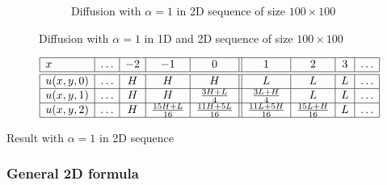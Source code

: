 \begin{figure}[ht]
\begin{subfigure}[b]{0.49\textwidth}
        \caption{Diffusion with $\alpha = 1$ in 2D sequence of size $100 \times 100$}
        \label{fig:diff_2d_100}
    \end{subfigure}
    \caption{Diffusion with $\alpha = 1$ in 1D and 2D sequence of size $100 \times 100$}
    \label{fig:diff_1d_vs_2d_100}
\end{figure}

\begin{table}[ht]
    \centering
    $$
        \begin{array}{|l|c|c|c|c||c|c|c|c|} \hline
        x       &\ldots&-2&       -1       &        0        &        1        &        2       &3&\ldots\\\hline \hline
        u(x,y,0)&\ldots& H&        H       &        H        &        L        &        L       &L&\ldots\\\hline
        u(x,y,1)&\ldots& H&        H       & \frac{3H+L}{4}  & \frac{3L+H}{4}  &        L       &L&\ldots\\\hline
        u(x,y,2)&\ldots& H&\frac{15H+L}{16}&\frac{11H+5L}{16}&\frac{11L+5H}{16}&\frac{15L+H}{16}&L&\ldots\\\hline
        \end{array}
    $$
    \caption{Result with $\alpha=1$ in 2D sequence}
    \label{tab:result_2d_1a}
\end{table}

\subsubsection{General 2D formula}

